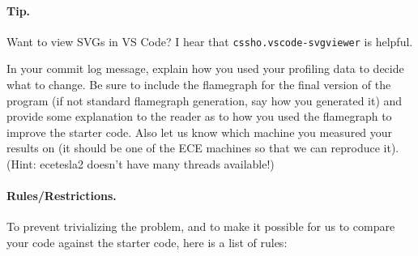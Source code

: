 \paragraph{Tip.} Want to view SVGs in VS Code? I hear that \texttt{cssho.vscode-svgviewer} is helpful.

In your commit log message, explain how you used your profiling data to decide what to change. Be sure to include the flamegraph for the final version of the program (if not standard flamegraph generation, say how you generated it) and provide some explanation to the reader as to how you used the flamegraph to improve the starter code. Also let us know which machine you measured your results on (it should be one of the ECE machines so that we can reproduce it). (Hint: ecetesla2 doesn't have many threads available!)


\paragraph {Rules/Restrictions.} To prevent trivializing the problem, and to make it possible for us to compare your code against the starter code, here is a list of rules:

